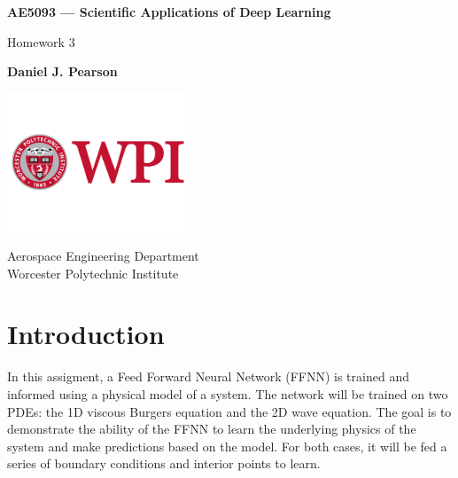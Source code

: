 \documentclass[11pt]{article}
\begin{document}
 


\begin{titlepage}
    \begin{center}
        \vspace*{1cm}

        \textbf{AE5093 — Scientific Applications of Deep Learning}

        \vspace{0.5cm}
            Homework 3
                
        \vspace{1.5cm}

        \textbf{Daniel J. Pearson}

        \vfill
                
        \vspace{0.8cm}
        
        \includegraphics[width=0.4\textwidth]{WPI_LOGO}

                
        Aerospace Engineering Department\\
        Worcester Polytechnic Institute\\
        \date{\today}
                
    \end{center}
\end{titlepage}

\pagebreak

\section{Introduction}
In this assigment, a Feed Forward Neural Network (FFNN) is trained and informed using a physical model of a system. The network will be trained on two PDEs: the 1D viscous Burgers equation and the 2D wave equation. The goal is to demonstrate the ability of the FFNN to learn the underlying physics of the system and make predictions based on the model. For both cases, it will be fed a series of boundary conditions and interior points to learn. 
\end{document}
